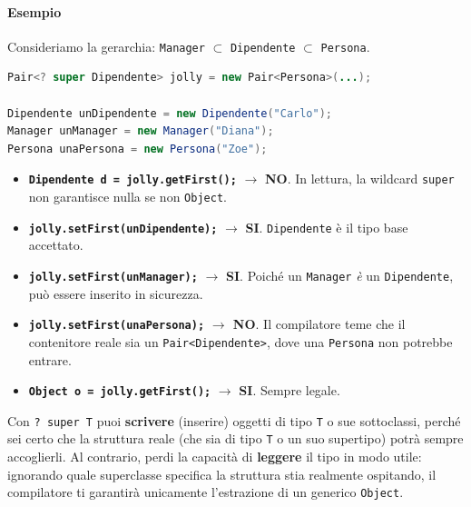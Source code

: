 \paragraph{Esempio}

Consideriamo la gerarchia: \texttt{Manager} $\subset$ \texttt{Dipendente} $\subset$ \texttt{Persona}.

\begin{lstlisting}[language=Java]
Pair<? super Dipendente> jolly = new Pair<Persona>(...); 

Dipendente unDipendente = new Dipendente("Carlo");
Manager unManager = new Manager("Diana");
Persona unaPersona = new Persona("Zoe");
\end{lstlisting}

\begin{itemize}
    \item \textbf{\texttt{Dipendente d = jolly.getFirst();}} $\rightarrow$ \textbf{NO}. In lettura, la wildcard \texttt{super} non garantisce nulla se non \texttt{Object}.
    \item \textbf{\texttt{jolly.setFirst(unDipendente);}} $\rightarrow$ \textbf{SI}. \texttt{Dipendente} è il tipo base accettato.
    \item \textbf{\texttt{jolly.setFirst(unManager);}} $\rightarrow$ \textbf{SI}. Poiché un \texttt{Manager} \textit{è} un \texttt{Dipendente}, può essere inserito in sicurezza.
    \item \textbf{\texttt{jolly.setFirst(unaPersona);}} \textbf{$\rightarrow$ NO}. Il compilatore teme che il contenitore reale sia un \texttt{Pair<Dipendente>}, dove una \texttt{Persona} non potrebbe entrare.
    \item \textbf{\texttt{Object o = jolly.getFirst();}} $\rightarrow$ \textbf{SI}. Sempre legale.
\end{itemize}

\begin{warningbox}[]
Con \texttt{? super T} puoi \textbf{scrivere} (inserire) oggetti di tipo \texttt{T} o sue sottoclassi, perché sei certo che la struttura reale (che sia di tipo \texttt{T} o un suo supertipo) potrà sempre accoglierli. Al contrario, perdi la capacità di \textbf{leggere} il tipo in modo utile: ignorando quale superclasse specifica la struttura stia realmente ospitando, il compilatore ti garantirà unicamente l'estrazione di un generico \texttt{Object}.
\end{warningbox}

